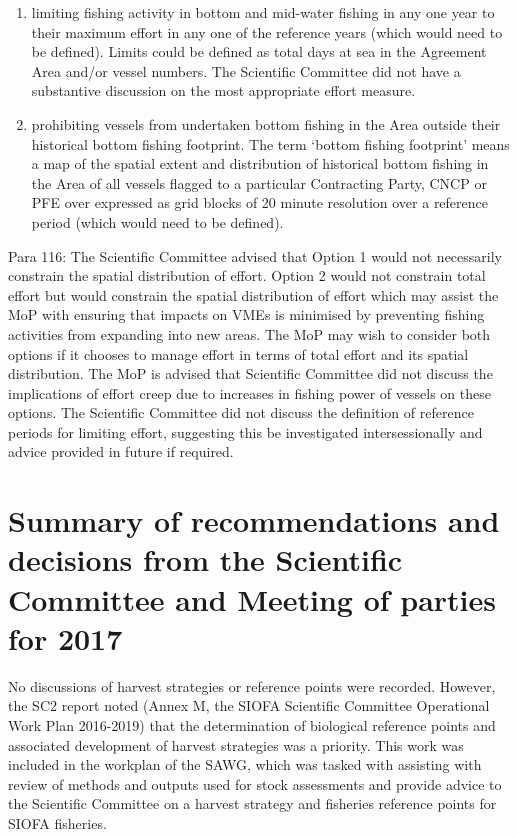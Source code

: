 \begin{enumerate}
	\item limiting fishing activity in bottom and mid-water fishing in any one year to their maximum effort in any one of the reference years (which would need to be defined). Limits could be defined as total days at sea in the Agreement Area and/or vessel numbers. The Scientific Committee did not have a substantive discussion on the most appropriate effort measure.
	\item prohibiting vessels from undertaken bottom fishing in the Area outside their historical bottom fishing footprint. The term ‘bottom fishing footprint’ means a map of the spatial extent and distribution of historical bottom fishing in the Area of all vessels flagged to a particular Contracting Party, CNCP or PFE over expressed as grid blocks of 20 minute resolution over a reference period (which would need to be defined).
\end{enumerate}

Para 116: The Scientific Committee advised that Option 1 would not necessarily constrain the spatial distribution of effort. Option 2 would not constrain total effort but would constrain the spatial distribution of effort which may assist the MoP with ensuring that impacts on VMEs is minimised by preventing fishing activities from expanding into new areas. The MoP may wish to consider both options if it chooses to manage effort in terms of total effort and its spatial distribution. The MoP is advised that Scientific Committee did not discuss the implications of effort creep due to increases in fishing power of vessels on these options. The Scientific Committee did not discuss the definition of reference periods for limiting effort, suggesting this be investigated intersessionally and advice provided in future if required.

\section{Summary of recommendations and decisions from the Scientific Committee and Meeting of parties for 2017}

No discussions of harvest strategies or reference points were recorded. However, the SC2 report \citep{SC2} noted (Annex M, the SIOFA Scientific Committee Operational Work Plan 2016-2019) that the determination of biological reference points and associated development of harvest strategies was a priority. This work was included in the workplan of the SAWG, which was tasked with assisting with review of methods and outputs used for stock assessments and provide advice to the Scientific Committee on a harvest strategy and fisheries reference points for SIOFA fisheries.

